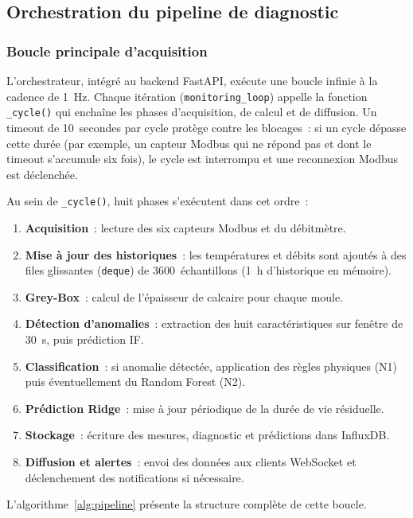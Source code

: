 \subsection{Orchestration du pipeline de diagnostic}

\subsubsection{Boucle principale d'acquisition}

L'orchestrateur, intégré au backend FastAPI, exécute une boucle infinie à la cadence de 1~Hz. Chaque itération (\texttt{monitoring\_loop}) appelle la fonction \texttt{\_cycle()} qui enchaîne les phases d'acquisition, de calcul et de diffusion. Un timeout de 10~secondes par cycle protège contre les blocages~: si un cycle dépasse cette durée (par exemple, un capteur Modbus qui ne répond pas et dont le timeout s'accumule six fois), le cycle est interrompu et une reconnexion Modbus est déclenchée.

Au sein de \texttt{\_cycle()}, huit phases s'exécutent dans cet ordre~:

\begin{enumerate}
  \item \textbf{Acquisition}~: lecture des six capteurs Modbus et du débitmètre.
  \item \textbf{Mise à jour des historiques}~: les températures et débits sont ajoutés à des files glissantes (\texttt{deque}) de 3600~échantillons (1~h d'historique en mémoire).
  \item \textbf{Grey-Box}~: calcul de l'épaisseur de calcaire pour chaque moule.
  \item \textbf{Détection d'anomalies}~: extraction des huit caractéristiques sur fenêtre de 30~s, puis prédiction IF.
  \item \textbf{Classification}~: si anomalie détectée, application des règles physiques (N1) puis éventuellement du Random Forest (N2).
  \item \textbf{Prédiction Ridge}~: mise à jour périodique de la durée de vie résiduelle.
  \item \textbf{Stockage}~: écriture des mesures, diagnostic et prédictions dans InfluxDB.
  \item \textbf{Diffusion et alertes}~: envoi des données aux clients WebSocket et déclenchement des notifications si nécessaire.
\end{enumerate}

L'algorithme~\ref{alg:pipeline} présente la structure complète de cette boucle.

